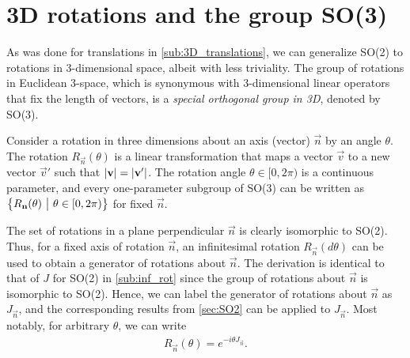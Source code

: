     \section{3D rotations and the group SO(3)}\label{sec:SO3}
    As was done for translations in \cref{sub:3D_translations}, we can generalize SO(2) to rotations in 3-dimensional space, albeit with less triviality. The group of rotations in Euclidean 3-space, which is synonymous with 3-dimensional linear operators that fix the length of vectors, is a \textit{special orthogonal group in 3D}, denoted by SO(3).

    Consider a rotation in three dimensions about an axis (vector) $\vec{n}$ by an angle $\theta$. The rotation $R_{\vec{n}}(\theta)$ is a linear transformation that maps a vector $\vec{v}$ to a new vector $\vec{v}'$ such that $\left|\mathbf{v}\right|=\left|\mathbf{v}'\right|$. The rotation angle $\theta\in[0,2\pi)$ is a continuous parameter, and every one-parameter subgroup of SO(3) can be written as $\left\{ R_{\mathbf{n}}(\theta) ~\big|~ \theta\in[0,2\pi) \right\}$ for fixed $\vec{n}$.
    
    The set of rotations in a plane perpendicular $\vec{n}$ is clearly isomorphic to SO(2). Thus, for a fixed axis of rotation $\vec{n}$, an infinitesimal rotation $R_{\vec{n}}(d\theta)$ can be used to obtain a generator of rotations about $\vec{n}$. The derivation is identical to that of $J$ for SO(2) in \cref{sub:inf_rot} since the group of rotations about $\vec{n}$ is isomorphic to SO(2). Hence, we can label the generator of rotations about $\vec{n}$ as $J_{\vec{n}}$, and the corresponding results from \cref{sec:SO2} can be applied to $J_{\vec{n}}$. Most notably, for arbitrary $\theta$, we can write
    \begin{align*}
        R_{\vec{n}}(\theta) = e^{-i\theta J_{\vec{n}}}.
    \end{align*}


